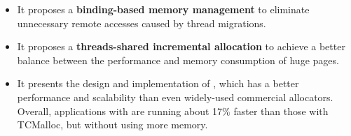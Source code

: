 \begin{itemize}

\item It proposes a \textbf{binding-based memory management} to eliminate unnecessary remote accesses caused by thread migrations.


\item It proposes a \textbf{threads-shared incremental allocation} to achieve a better balance between the performance and memory consumption of huge pages. 


\item It presents the design and implementation of \NM{}, which has a better performance and scalability than even widely-used commercial allocators. Overall, applications with \NM{} are running about 17\% faster than those with TCMalloc, but without using more memory.

\end{itemize}

